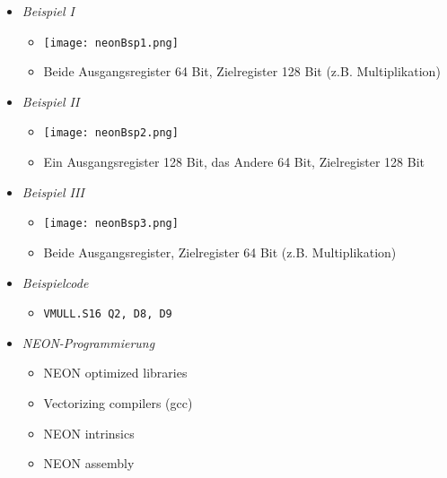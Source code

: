 \begin{itemize}
\begin{itemize}
                \item \textit{Beispiel I}
                    \begin{itemize}
                        \item[] \texttt{[image: neonBsp1.png]}
                        \item[] Beide Ausgangsregister 64 Bit, Zielregister 128 Bit (z.B. Multiplikation)
                    \end{itemize}
\pagebreak
                \item \textit{Beispiel II}
                    \begin{itemize}
                        \item[] \texttt{[image: neonBsp2.png]}
                        \item[] Ein Ausgangsregister 128 Bit, das Andere 64 Bit, Zielregister 128 Bit
                    \end{itemize}
                \item \textit{Beispiel III}
                    \begin{itemize}
                        \item[] \texttt{[image: neonBsp3.png]}
                        \item[] Beide Ausgangsregister, Zielregister 64 Bit (z.B. Multiplikation)
                    \end{itemize}
                \item \textit{Beispielcode}
                    \begin{itemize}
                        \item \texttt{VMULL.S16 Q2, D8, D9}
                    \end{itemize}
                \item \textit{NEON-Programmierung}
                    \begin{itemize}
                        \item NEON optimized libraries
                        \item Vectorizing compilers (gcc)
                        \item NEON intrinsics
                        \item NEON assembly
                    \end{itemize}
            \end{itemize} 


\end{itemize}
